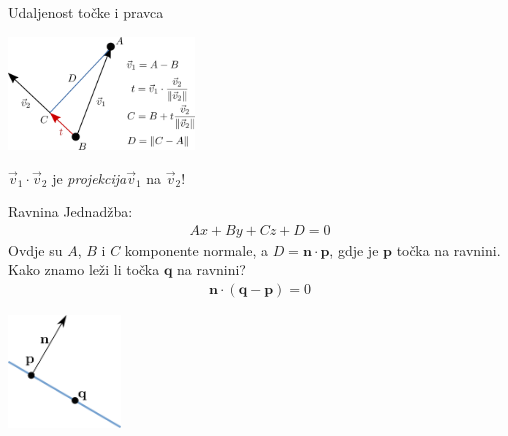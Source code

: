 \documentclass[9pt]{beamer}
\begin{document}
\begin{frame}{Udaljenost točke i pravca}
	\begin{center}
		\includegraphics[height=3cm]{./slike/linear_algebra_line_point_distance.png}
	\end{center}
	$\vec{v}_1\cdot \vec{v}_2$ je \textit{projekcija}$\vec{v}_1$ na $\vec{v}_2$!
\end{frame}

\begin{frame}{Ravnina}
	Jednadžba:
	\begin{align*}
	Ax + By + Cz + D = 0
	\end{align*}
	Ovdje su $A$, $B$ i $C$ komponente normale, a $D = \mathbf{n}\cdot \mathbf{p}$, gdje je $\mathbf{p}$ točka na ravnini.\\
	Kako znamo leži li točka $\mathbf{q}$ na ravnini? \\
	\begin{align*}
	 \mathbf{n} \cdot (\mathbf{q} - \mathbf{p}) = 0
	\end{align*}	
	\begin{center}
		\includegraphics[height=3cm]{./slike/ravnina_01_01.png}
	\end{center}
\end{frame}
\end{document}
